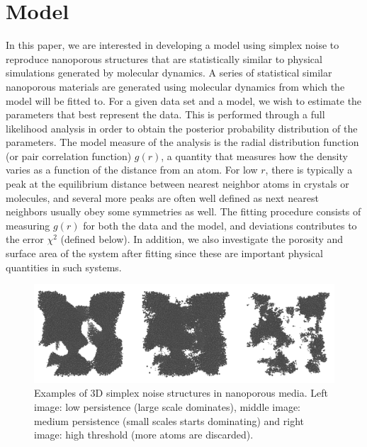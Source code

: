 \documentclass[aps,pre,twocolumn,letterpaper,floatfix,showpacs]{revtex4}
\begin{document}
\section{Model}
In this paper, we are interested in developing a model using simplex noise to reproduce
nanoporous structures that are statistically similar to physical simulations generated by molecular dynamics.
A series of statistical similar nanoporous materials are generated using molecular dynamics from which the model will be fitted to.
For a given data set and a model, we wish to estimate the parameters that best represent the data. 
This is performed through a full likelihood analysis in order to obtain the posterior probability distribution of the parameters. 
The model measure of the analysis is the radial distribution function (or pair correlation function) $g(r)$, a quantity that measures how the density varies as a function of the distance from an atom.
For low $r$, there is typically a peak at the equilibrium distance between nearest neighbor atoms in crystals or molecules, and several more peaks are often well defined as next nearest neighbors usually obey some symmetries as well.
The fitting procedure consists of measuring $g(r)$ for both the data and the model, and deviations contributes to the error $\chi^2$ (defined below).
In addition, we also investigate the porosity and surface area of the system after fitting since these are important physical quantities in such systems.

\begin{figure}
\includegraphics[width=.95\textwidth]{model_examples.png}
\caption{Examples of 3D simplex noise structures in nanoporous media. Left image:
low persistence (large scale dominates), middle image: medium persistence (small
scales starts dominating) and right image: high threshold (more atoms are discarded). }
\label{fig:model_example}
\end{figure}
\end{document}
